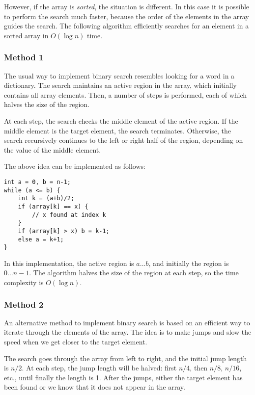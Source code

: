 However, if the array is \emph{sorted},
the situation is different.
In this case it is possible to perform the
search much faster, because the order of the
elements in the array guides the search.
The following  algorithm
efficiently searches for an element in a sorted array
in $O(\log n)$ time.

\subsubsection{Method 1}

The usual way to implement binary search
resembles looking for a word in a dictionary.
The search maintains an active region in the array,
which initially contains all array elements.
Then, a number of steps is performed,
each of which halves the size of the region.

At each step, the search checks the middle element
of the active region.
If the middle element is the target element,
the search terminates.
Otherwise, the search recursively continues
to the left or right half of the region,
depending on the value of the middle element.

The above idea can be implemented as follows:
\begin{lstlisting}
int a = 0, b = n-1;
while (a <= b) {
    int k = (a+b)/2;
    if (array[k] == x) {
        // x found at index k
    }
    if (array[k] > x) b = k-1;
    else a = k+1;
}
\end{lstlisting}

In this implementation, the active region is $a \ldots b$,
and initially the region is $0 \ldots n-1$.
The algorithm halves the size of the region at each step,
so the time complexity is $O(\log n)$.

\subsubsection{Method 2}

An alternative method to implement binary search
is based on an efficient way to iterate through
the elements of the array.
The idea is to make jumps and slow the speed
when we get closer to the target element.

The search goes through the array from left to
right, and the initial jump length is $n/2$.
At each step, the jump length will be halved:
first $n/4$, then $n/8$, $n/16$, etc., until
finally the length is 1.
After the jumps, either the target element has
been found or we know that it does not appear in the array.

